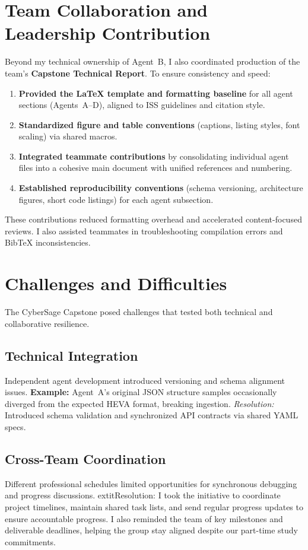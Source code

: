 \documentclass[12pt,a4paper]{article}
\begin{document}
\section{Team Collaboration and Leadership Contribution}
\label{sec:team}
Beyond my technical ownership of Agent~B, I also coordinated production of the team’s \textbf{Capstone Technical Report}. To ensure consistency and speed:
\begin{enumerate}[noitemsep]
    \item \textbf{Provided the \LaTeX{} template and formatting baseline} for all agent sections (Agents~A--D), aligned to ISS guidelines and citation style.
    \item \textbf{Standardized figure and table conventions} (captions, listing styles, font scaling) via shared macros.
    \item \textbf{Integrated teammate contributions} by consolidating individual agent files into a cohesive main document with unified references and numbering.
    \item \textbf{Established reproducibility conventions} (schema versioning, architecture figures, short code listings) for each agent subsection.
\end{enumerate}
These contributions reduced formatting overhead and accelerated content-focused reviews. I also assisted teammates in troubleshooting compilation errors and Bib\TeX{} inconsistencies.

\section{Challenges and Difficulties}
\label{sec:challenges}
The CyberSage Capstone posed challenges that tested both technical and collaborative resilience.

\subsection{Technical Integration}
Independent agent development introduced versioning and schema alignment issues. \textbf{Example:} Agent~A’s original JSON structure samples occasionally diverged from the expected HEVA format, breaking ingestion. \textit{Resolution:} Introduced schema validation and synchronized API contracts via shared YAML specs.

\subsection{Cross-Team Coordination}
Different professional schedules limited opportunities for synchronous debugging and progress discussions. 	extit{Resolution:} I took the initiative to coordinate project timelines, maintain shared task lists, and send regular progress updates to ensure accountable progress. I also reminded the team of key milestones and deliverable deadlines, helping the group stay aligned despite our part-time study commitments.
\end{document}
